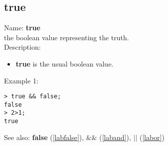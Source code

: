 \subsection{true}
\label{labtrue}
\noindent Name: \textbf{true}\\
the boolean value representing the truth.\\

\noindent Description: \begin{itemize}

\item \textbf{true} is the usual boolean value.
\end{itemize}
\noindent Example 1: 
\begin{center}\begin{minipage}{15cm}\begin{Verbatim}[frame=single]
> true && false;
false
> 2>1;
true
\end{Verbatim}
\end{minipage}\end{center}
See also: \textbf{false} (\ref{labfalse}), \textbf{$\&\&$} (\ref{laband}), \textbf{$||$} (\ref{labor})

